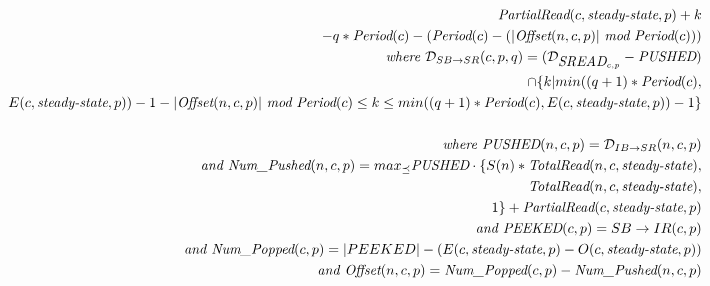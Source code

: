 \begin{itemize}
\begin{align*}
                    \mt{PartialRead}(c,\mt{steady-state},p) + k  \\
                   - q * \mt{Period}(c) 
                   - (\mt{Period}(c) - (|\mt{Offset}(n,c,p)|~\mt{mod}~\mt{Period}(c))) \\
\mt{where }{\cal D}_{SB \rightarrow SR}(c,p,q) = 
  ({\cal D}_{\mt{SREAD}_{c, p}} - \mt{PUSHED}) \\
                         \cap \{ k | min((q+1)*\mt{Period}(c), \\
                                        E(c, \mt{steady-state}, p)) - 1 
                                        - |\mt{Offset}(n,c,p)|~\mt{mod}~\mt{Period}(c)
                                \le k 
                                \le min((q+1)*\mt{Period}(c), 
                                        E(c, \mt{steady-state}, p)) - 1 \} \\ ~ \\
%
%
\mt{where }\mt{PUSHED}(n,c,p) = {\cal D}_{IB \rightarrow SR}(n,c,p) \\
\mt{and }\mt{Num\_Pushed}(n,c,p) = 
  max_{\preceq}\mt{PUSHED} \cdot \{S(n) * \mt{TotalRead}(n,c,\mt{steady-state}), \\
                                        \mt{TotalRead}(n,c,\mt{steady-state}), \\
                                        1 \} + \mt{PartialRead}(c, \mt{steady-state}, p) \\
\mt{and }\mt{PEEKED}(c,p) = {SB \rightarrow IR}(c,p) \\
\mt{and }\mt{Num\_Popped}(c,p) = |PEEKED| - (E(c,\mt{steady-state},p) - O(c,\mt{steady-state},p)) \\
\mt{and }\mt{Offset}(n,c,p) = \mt{Num\_Popped}(c,p)-\mt{Num\_Pushed}(n,c,p) \\
%
\end{align*}

\end{itemize}

